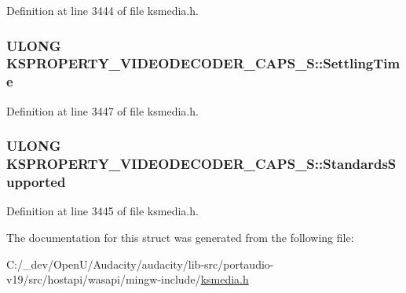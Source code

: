 Definition at line 3444 of file ksmedia.\+h.

\subsubsection[{\texorpdfstring{Settling\+Time}{SettlingTime}}]{\setlength{\rightskip}{0pt plus 5cm}U\+L\+O\+NG K\+S\+P\+R\+O\+P\+E\+R\+T\+Y\+\_\+\+V\+I\+D\+E\+O\+D\+E\+C\+O\+D\+E\+R\+\_\+\+C\+A\+P\+S\+\_\+\+S\+::\+Settling\+Time}\hypertarget{struct_k_s_p_r_o_p_e_r_t_y___v_i_d_e_o_d_e_c_o_d_e_r___c_a_p_s___s_a311e426096c691141ac95dcb75d74bd4}{}\label{struct_k_s_p_r_o_p_e_r_t_y___v_i_d_e_o_d_e_c_o_d_e_r___c_a_p_s___s_a311e426096c691141ac95dcb75d74bd4}


Definition at line 3447 of file ksmedia.\+h.

\subsubsection[{\texorpdfstring{Standards\+Supported}{StandardsSupported}}]{\setlength{\rightskip}{0pt plus 5cm}U\+L\+O\+NG K\+S\+P\+R\+O\+P\+E\+R\+T\+Y\+\_\+\+V\+I\+D\+E\+O\+D\+E\+C\+O\+D\+E\+R\+\_\+\+C\+A\+P\+S\+\_\+\+S\+::\+Standards\+Supported}\hypertarget{struct_k_s_p_r_o_p_e_r_t_y___v_i_d_e_o_d_e_c_o_d_e_r___c_a_p_s___s_adb8dbde42c2d8a12f3ae9ec6da805850}{}\label{struct_k_s_p_r_o_p_e_r_t_y___v_i_d_e_o_d_e_c_o_d_e_r___c_a_p_s___s_adb8dbde42c2d8a12f3ae9ec6da805850}


Definition at line 3445 of file ksmedia.\+h.



The documentation for this struct was generated from the following file\+:\begin{DoxyCompactItemize}
\item 
C\+:/\+\_\+dev/\+Open\+U/\+Audacity/audacity/lib-\/src/portaudio-\/v19/src/hostapi/wasapi/mingw-\/include/\hyperlink{ksmedia_8h}{ksmedia.\+h}\end{DoxyCompactItemize}
